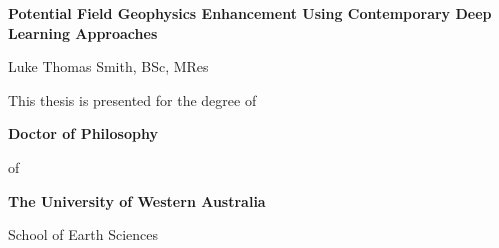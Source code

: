 \documentclass[12pt,a4paper]{report} %
\begin{document}
\begin{titlepage}

    \begin{center}
        \large{\textbf{Potential Field Geophysics Enhancement Using Contemporary Deep Learning Approaches}}

        \vspace{15 mm}
        {\large{Luke Thomas Smith, BSc, MRes}}

        \vspace{15 mm}
        This thesis is presented for the degree of

        \vspace{5 mm}
        \textbf{Doctor of Philosophy}

        of

        \textbf{The University of Western Australia}
        \vspace{5 mm}

        School of Earth Sciences
        \vspace{15 mm}


\end{center}
\end{titlepage}
\end{document}
